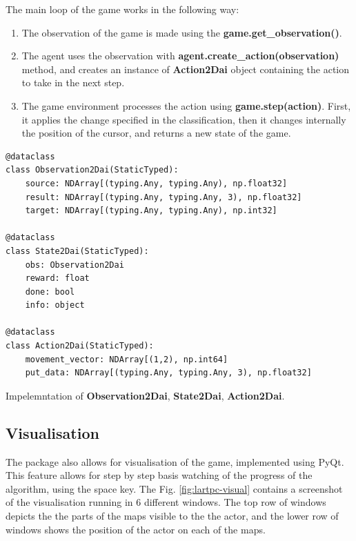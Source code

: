 The main loop of the game works in the following way:

\begin{enumerate}
    \item The observation of the game is made using the \textbf{game.get\_observation()}.
  \item The agent uses the observation with \textbf{agent.create\_action(observation)} method, and creates an instance of \textbf{Action2Dai} object containing the action to take in the next step.
  \item The game environment processes the action using \textbf{game.step(action)}. First, it applies the change specified in the classification, then it changes internally the position of the cursor, and returns a new state of the game.
\end{enumerate}


\begin{listing}[!ht]
\begin{verbatim}
@dataclass
class Observation2Dai(StaticTyped):
    source: NDArray[(typing.Any, typing.Any), np.float32]
    result: NDArray[(typing.Any, typing.Any, 3), np.float32]
    target: NDArray[(typing.Any, typing.Any), np.int32]

@dataclass
class State2Dai(StaticTyped):
    obs: Observation2Dai
    reward: float
    done: bool
    info: object

@dataclass
class Action2Dai(StaticTyped):
    movement_vector: NDArray[(1,2), np.int64]
    put_data: NDArray[(typing.Any, typing.Any, 3), np.float32]
\end{verbatim}
\caption{Impelemntation of \textbf{Observation2Dai}, \textbf{State2Dai}, \textbf{Action2Dai}.}
\label{listing:rl_observables}
\end{listing}

\subsection{Visualisation}

The package also allows for visualisation of the game, implemented using PyQt.
This feature allows for step by step basis watching of the progress of the algorithm, using the space key.
The Fig. \ref{fig:lartpc-visual} contains a screenshot of the visualisation running in 6 different windows.
The top row of windows depicts the the parts of the maps visible to the the actor, and the lower row of windows shows the position of the actor on each of the maps.


